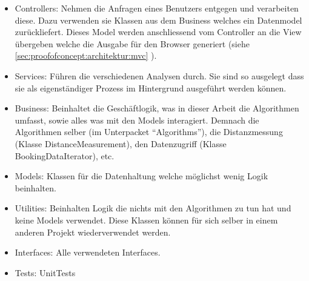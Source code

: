 \begin{itemize}
	\item Controllers: Nehmen die Anfragen eines Benutzers entgegen und verarbeiten diese. Dazu verwenden sie Klassen aus dem Business welches ein Datenmodel zurückliefert. Dieses Model werden anschliessend vom Controller an die View übergeben welche die Ausgabe für den Browser generiert (siehe \cref{sec:proofofconcept:architektur:mvc} ).
	\item Services: Führen die verschiedenen Analysen durch. Sie sind so ausgelegt dass sie als eigenständiger Prozess im Hintergrund ausgeführt werden können.
	\item Business: Beinhaltet die Geschäftlogik, was in dieser Arbeit die Algorithmen umfasst, sowie alles was mit den Models interagiert. Demnach die Algorithmen selber (im Unterpacket "`Algorithms"'), die Distanzmessung (Klasse DistanceMeasurement), den Datenzugriff (Klasse BookingDataIterator), etc.
	\item Models: Klassen für die Datenhaltung welche möglichst wenig Logik beinhalten.
	\item Utilities: Beinhalten Logik die nichts mit den Algorithmen zu tun hat und keine Models verwendet. Diese Klassen können für sich selber in einem anderen Projekt wiederverwendet werden.
	\item Interfaces: Alle verwendeten Interfaces.
	\item Tests: UnitTests
\end{itemize}

